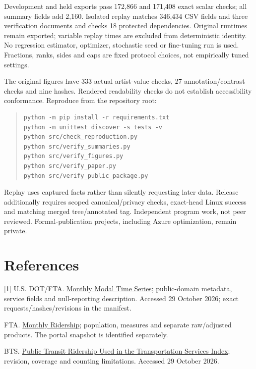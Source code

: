 \documentclass[11pt]{article}
\begin{document}
Development and held exports pass 172,866 and 171,408 exact scalar checks; all summary fields add 2,160. Isolated replay matches 346,434 CSV fields and three verification documents and checks 18 protected dependencies. Original runtimes remain exported; variable replay times are excluded from deterministic identity. No regression estimator, optimizer, stochastic seed or fine-tuning run is used. Fractions, ranks, sides and caps are fixed protocol choices, not empirically tuned settings.

The original figures have 333 actual artist-value checks, 27 annotation/contrast checks and nine hashes. Rendered readability checks do not establish accessibility conformance. Reproduce from the repository root:

\begin{quote}\small\begin{verbatim}
python -m pip install -r requirements.txt
python -m unittest discover -s tests -v
python src/check_reproduction.py
python src/verify_summaries.py
python src/verify_figures.py
python src/verify_paper.py
python src/verify_public_package.py
\end{verbatim}\end{quote}
Replay uses captured facts rather than silently requesting later data. Release additionally requires scoped canonical/privacy checks, exact-head Linux success and matching merged tree/annotated tag. Independent program work, not peer reviewed. Formal-publication projects, including Azure optimization, remain private.

\section*{References}\small
[1] U.S. DOT/FTA. \href{https://data.transportation.gov/Public-Transit/Monthly-Modal-Time-Series/5ti2-5uiv}{Monthly Modal Time Series}; public-domain metadata, service fields and null-reporting description. Accessed 29 October 2026; exact requests/hashes/revisions in the manifest.\par
[2] FTA. \href{https://www.transit.dot.gov/ntd/monthly-ridership}{Monthly Ridership}; population, measures and separate raw/adjusted products. The portal snapshot is identified separately.\par
[3] BTS. \href{https://www.bts.gov/learn-about-bts-and-our-work/statistical-methods-and-policies/public-transit-ridership}{Public Transit Ridership Used in the Transportation Services Index}; revision, coverage and counting limitations. Accessed 29 October 2026.
\end{document}
